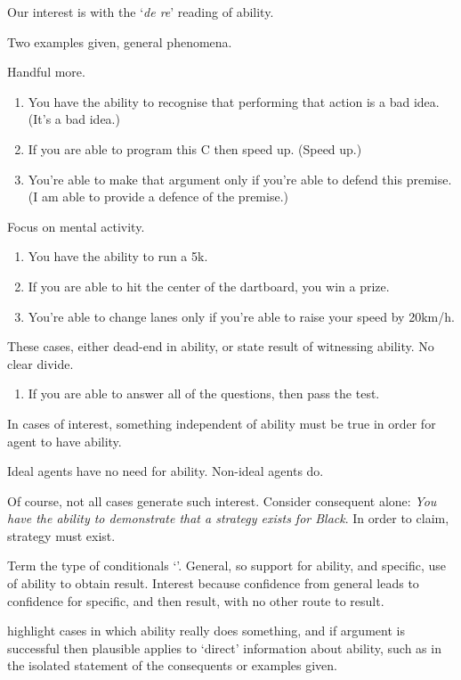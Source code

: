 \begin{note}
  Our interest is with the `\emph{de re}' reading of ability.
  
  Two examples given, general phenomena.

  Handful more.
  \begin{enumerate}
  \item You have the ability to recognise that performing that action is a bad idea. (It's a bad idea.)
  \item If you are able to program this C then speed up. (Speed up.)
  \item You're able to make that argument only if you're able to defend this premise. (I am able to provide a defence of the premise.)
  \end{enumerate}
  Focus on mental activity.
  \begin{enumerate}
  \item You have the ability to run a 5k.
  \item If you are able to hit the center of the dartboard, you win a prize.
  \item You're able to change lanes only if you're able to raise your speed by 20km/h.
  \end{enumerate}
  These cases, either dead-end in ability, or state result of witnessing ability.
  No clear divide.
  \begin{enumerate}
  \item If you are able to answer all of the questions, then pass the test.
  \end{enumerate}
  In cases of interest, something independent of ability must be true in order for agent to have ability.
\end{note}

\begin{note}
  Ideal agents have no need for ability.
  Non-ideal agents do.
\end{note}

\begin{note}[GSI]
  Of course, not all cases generate such interest.
  Consider consequent alone:
  \emph{You have the ability to demonstrate that a strategy exists for Black}.
  In order to claim, strategy must exist.

  Term the type of conditionals `\gsi{}'.
  General, so support for ability, and specific, use of ability to obtain result.
  Interest because confidence from general leads to confidence for specific, and then result, with no other route to result.

  \gsi{} highlight cases in which ability really does something, and if argument is successful then plausible applies to `direct' information about ability, such as in the isolated statement of the consequents or examples given.
\end{note}

